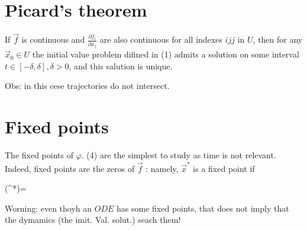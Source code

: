 \section*{Picard's theorem}
If $\vec{f}$ is continuous and $\frac{\partial f_{i}}{\partial x_{j}}$ are also continuous for all indexes $i j j$ in $U$, then for any $\vec{x}_{0} \in U$ the initial value problem difined in (1) admits a solution on some interval $t \in[-\delta, \delta], \delta>0$, and this salution is unique.

Obs: in this cese trajectories do not intersect.

\section*{Fixed points}
The fixed points of $\varphi$. (4) are the simplest to study as time is not relevant. Indeed, fixed points are the zeros of $\vec{f}$ : namely, $\vec{x}^{*}$ is a fixed point if
\begin{DispWithArrows}[format=c, displaystyle]
\left(^{*}\right)=
\end{DispWithArrows}
Worning: even thoyh an $O D E$ has some fixed points, that does not imply that the dymamics (the imit. Val. solut.) seach them!
